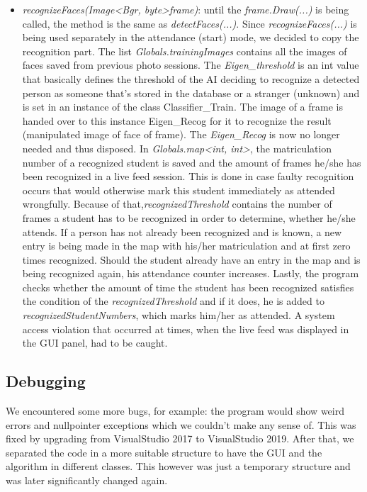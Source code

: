 \documentclass[12pt, a4paper]{article}
\begin{document}
\begin{itemize}
\item\textit{recognizeFaces(Image\textless Bgr, byte\textgreater frame)}: until the \textit{frame.Draw(...)} is being called, the method is the same as \textit{detectFaces(...)}. Since \textit{recognizeFaces(...)} is being used separately in the attendance (start) mode, we decided to copy the recognition part. The list \textit{Globals.trainingImages} contains all the images of faces saved from previous photo sessions. The \textit{Eigen\_threshold} is an int value that basically defines the threshold of the AI deciding to recognize a detected person as someone that's stored in the database or a stranger (unknown) and is set in an instance of the class Classifier\_Train. The image of a frame is handed over to this instance Eigen\_Recog for it to recognize the result (manipulated image of face of frame). The \textit{Eigen\_Recog} is now no longer needed and thus disposed. In \textit{Globals.map\textless int, int\textgreater}, the matriculation number of a recognized student is saved and the amount of frames he/she has been recognized in a live feed session. This is done in case faulty recognition occurs that would otherwise mark this student immediately as attended wrongfully. Because of that,\textit{recognizedThreshold} contains the number of frames a student has to be recognized in order to determine, whether he/she attends. If a person has not already been recognized and is known, a new entry is being made in the map with his/her matriculation and at first zero times recognized. Should the student already have an entry in the map and is being recognized again, his attendance counter increases. Lastly, the program checks whether the amount of time the student has been recognized satisfies the condition of the \textit{recognizedThreshold} and if it does, he is added to \textit{recognizedStudentNumbers}, which marks him/her as attended. A system access violation that occurred at times, when the live feed was displayed in the GUI panel, had to be caught.
\end{itemize}
\subsection{Debugging}
We encountered some more bugs, for example: the program would show weird errors and nullpointer exceptions which we couldn't make any sense of. This was fixed by upgrading from VisualStudio 2017 to VisualStudio 2019. After that, we separated the code in a more suitable structure to have the GUI and the algorithm in different classes. This however was just a temporary structure and was later significantly changed again.
\end{document}
